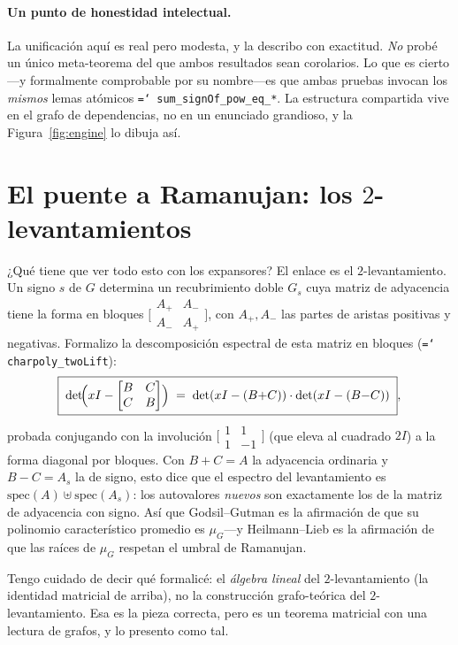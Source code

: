 \documentclass[11pt]{article}
\newcommand{\lean}[1]{\texttt{\hyphenchar\font=`\- #1}}
\begin{document}
\paragraph{Un punto de honestidad intelectual.}
La unificación aquí es real pero modesta, y la describo con exactitud. \emph{No}
probé un único meta-teorema del que ambos resultados sean corolarios. Lo que es
cierto---y formalmente comprobable por su nombre---es que ambas pruebas invocan
los \emph{mismos} lemas atómicos \lean{sum\_signOf\_pow\_eq\_*}. La estructura
compartida vive en el grafo de dependencias, no en un enunciado grandioso, y la
Figura~\ref{fig:engine} lo dibuja así.

\section{El puente a Ramanujan: los $2$-levantamientos}
\label{sec:twolift}

¿Qué tiene que ver todo esto con los expansores? El enlace es el
$2$-levantamiento. Un signo $s$ de $G$ determina un recubrimiento doble $G_s$ cuya
matriz de adyacencia tiene la forma en bloques
$\bigl[\begin{smallmatrix}A_+&A_-\\A_-&A_+\end{smallmatrix}\bigr]$, con $A_+,A_-$
las partes de aristas positivas y negativas. Formalizo la descomposición espectral
de esta matriz en bloques (\lean{charpoly\_twoLift}):
\[
  \boxed{\;\det\!\Bigl(xI-\begin{bmatrix}B&C\\ C&B\end{bmatrix}\Bigr)
  \;=\;\det(xI-(B{+}C))\cdot\det(xI-(B{-}C))\;},
\]
probada conjugando con la involución
$\bigl[\begin{smallmatrix}1&1\\1&-1\end{smallmatrix}\bigr]$ (que eleva al cuadrado
$2I$) a la forma diagonal por bloques. Con $B{+}C=A$ la adyacencia ordinaria y
$B{-}C=A_s$ la de signo, esto dice que el espectro del levantamiento es
$\mathrm{spec}(A)\uplus\mathrm{spec}(A_s)$: los autovalores \emph{nuevos} son
exactamente los de la matriz de adyacencia con signo. Así que Godsil--Gutman es la
afirmación de que su polinomio característico promedio es $\mu_G$---y Heilmann--Lieb
es la afirmación de que las raíces de $\mu_G$ respetan el umbral de Ramanujan.

Tengo cuidado de decir qué formalicé: el \emph{álgebra lineal} del
$2$-levantamiento (la identidad matricial de arriba), no la construcción
grafo-teórica del $2$-levantamiento. Esa es la pieza correcta, pero es un teorema
matricial con una lectura de grafos, y lo presento como tal.
\end{document}
